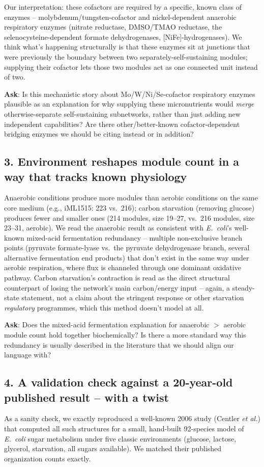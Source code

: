 \documentclass[11pt]{article}
\begin{document}
Our interpretation: these cofactors are required by a specific, known class of enzymes -- molybdenum/tungsten-cofactor and nickel-dependent anaerobic respiratory enzymes (nitrate reductase, DMSO/TMAO reductase, the selenocysteine-dependent formate dehydrogenases, [NiFe]-hydrogenases). We think what's happening structurally is that these enzymes sit at junctions that were previously the boundary between two separately-self-sustaining modules; supplying their cofactor lets those two modules act as one connected unit instead of two.

\textbf{Ask}: Is this mechanistic story about Mo/W/Ni/Se-cofactor respiratory enzymes plausible as an explanation for why supplying these micronutrients would \emph{merge} otherwise-separate self-sustaining subnetworks, rather than just adding new independent capabilities? Are there other/better-known cofactor-dependent bridging enzymes we should be citing instead or in addition?

\subsection*{3. Environment reshapes module count in a way that tracks known physiology}
Anaerobic conditions produce more modules than aerobic conditions on the same core medium (e.g., iML1515: 223 vs.\ 216); carbon starvation (removing glucose) produces fewer and smaller ones (214 modules, size 19--27, vs.\ 216 modules, size 23--31, aerobic). We read the anaerobic result as consistent with \textit{E.\ coli}'s well-known mixed-acid fermentation redundancy -- multiple non-exclusive branch points (pyruvate formate-lyase vs.\ the pyruvate dehydrogenase branch, several alternative fermentation end products) that don't exist in the same way under aerobic respiration, where flux is channeled through one dominant oxidative pathway. Carbon starvation's contraction is read as the direct structural counterpart of losing the network's main carbon/energy input -- again, a steady-state statement, not a claim about the stringent response or other starvation \emph{regulatory} programmes, which this method doesn't model at all.

\textbf{Ask}: Does the mixed-acid fermentation explanation for anaerobic $>$ aerobic module count hold together biochemically? Is there a more standard way this redundancy is usually described in the literature that we should align our language with?

\subsection*{4. A validation check against a 20-year-old published result -- with a twist}
As a sanity check, we exactly reproduced a well-known 2006 study (Centler \textit{et al.}) that computed all such structures for a small, hand-built 92-species model of \textit{E.\ coli} sugar metabolism under five classic environments (glucose, lactose, glycerol, starvation, all sugars available). We matched their published organization counts exactly.
\end{document}
